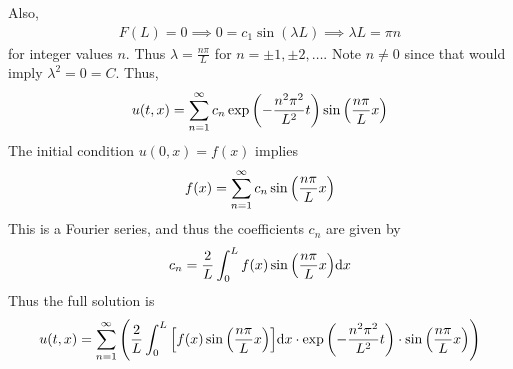 \documentclass[fontsize=11pt]{article} %
\theoremstyle{plain}
\numberwithin{equation}{section} %
\numberwithin{figure}{section} %
\numberwithin{table}{section} %
\begin{document}
Also,
\begin{align*}
    F(L) = 0 \implies 0 = c_1 \sin(\lambda L) \implies \lambda L = \pi n
\end{align*}
for integer values $n$.  Thus $\lambda = \frac{n\pi}{L}$ for $n = \pm 1, \pm 2, \dots$.  Note $n \neq 0$ since that would imply $\lambda^2 = 0 = C$.  Thus,
\begin{align*}
    u(t,x) = \sum_{n=1}^\infty c_n \exp\qty(-\frac{n^2 \pi^2}{L^2}t)\sin\qty(\frac{n\pi}{L}x)
\end{align*}
The initial condition $u(0,x) = f(x)$ implies
\begin{align*}
    f(x) = \sum_{n=1}^\infty c_n\sin\qty(\frac{n\pi}{L}x)
\end{align*}
This is a Fourier series, and thus the coefficients $c_n$ are given by
\begin{align*}
    c_n = \frac{2}{L}\int_0^L f(x) \sin\qty(\frac{n\pi}{L}x)\dd x
\end{align*}
Thus the full solution is
\begin{align*}
    u(t,x) = \sum_{n=1}^\infty \qty(\frac{2}{L}\int_0^L \qty[f(x) \sin\qty(\frac{n\pi}{L}x)]\dd x \cdot \exp\qty(-\frac{n^2 \pi^2}{L^2}t)\cdot\sin\qty(\frac{n\pi}{L}x))
\end{align*}
\end{document}

